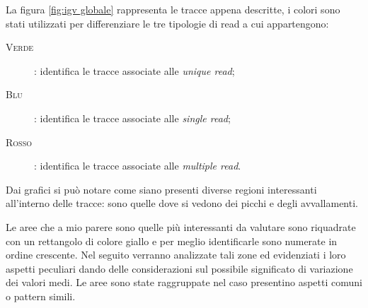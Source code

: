 La figura \ref{fig:igv globale} rappresenta le tracce appena descritte, i colori sono stati utilizzati per differenziare le tre tipologie di read a cui appartengono:
\begin{description}
\item[\textsc{Verde}]: identifica le tracce associate alle \emph{unique read};
\item[\textsc{Blu}]: identifica le tracce associate alle \emph{single read};
\item[\textsc{Rosso}]: identifica le tracce associate alle \emph{multiple read}.
\end{description}

Dai grafici si può notare come siano presenti diverse regioni interessanti all'interno delle tracce: sono quelle dove si vedono dei picchi e degli avvallamenti.

Le aree che a mio parere sono quelle più interessanti da valutare sono riquadrate con un rettangolo di colore giallo e per meglio identificarle sono numerate in ordine crescente.
Nel seguito verranno analizzate tali zone ed evidenziati i loro aspetti peculiari dando delle considerazioni sul possibile significato di variazione dei valori medi.
Le aree sono state raggruppate nel caso presentino aspetti comuni o pattern simili.

